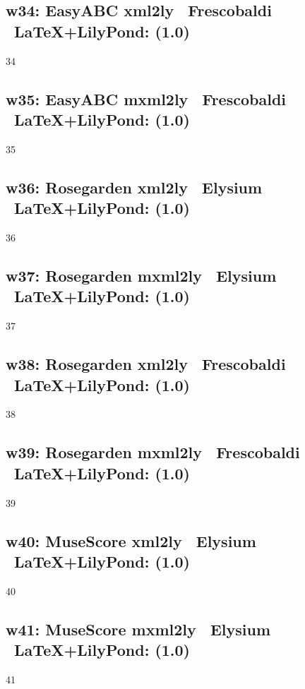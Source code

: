 \subsection{w34: Easy\-ABC \ra xml2ly \ra\ Frescobaldi \ra\ \LaTeX+LilyPond: (1.0)}

34

\subsection{w35: Easy\-ABC \ra mxml2ly \ra\ Frescobaldi \ra\ \LaTeX+LilyPond: (1.0)} 

35

\subsection{w36: Rosegarden \ra xml2ly \ra\ Elysium \ra\ \LaTeX+LilyPond: (1.0)}

36

\subsection{w37: Rosegarden \ra mxml2ly \ra\ Elysium \ra\ \LaTeX+LilyPond: (1.0)}

37

\subsection{w38: Rosegarden \ra xml2ly \ra\ Frescobaldi \ra\ \LaTeX+LilyPond: (1.0)}

38

\subsection{w39: Rosegarden \ra mxml2ly \ra\ Frescobaldi \ra\ \LaTeX+LilyPond: (1.0)}

39

\subsection{w40: MuseScore \ra xml2ly \ra\ Elysium \ra\ \LaTeX+LilyPond: (1.0)}

40

\subsection{w41: MuseScore \ra mxml2ly \ra\ Elysium \ra\ \LaTeX+LilyPond: (1.0)}

41

